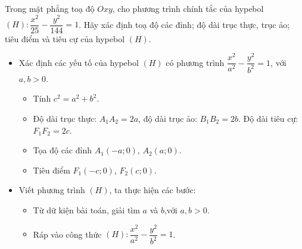 \begin{vd}%
	Trong mặt phẳng toạ độ $Oxy$, cho phương trình chính tắc của hypebol $(H)\colon \dfrac{x^2}{25}-\dfrac{y^2}{144}=1$. Hãy xác định toạ độ các đỉnh; độ dài trục thực, trục ảo; tiêu điểm và tiêu cự của hypebol $(H)$.
\end{vd}
\begin{dang}
		\begin{itemize}
		\item Xác định các yếu tố của hypebol $(H)$ có phương trình $\dfrac{x^2}{a^2}-\dfrac{y^2}{b^2}=1$, với $a,b>0$.
		\begin{itemize}
			\item Tính $c^2 = a^2 + b^2$.
			\item Độ dài trục thực: $A_1 A_2 = 2a$, độ dài trục ảo: $B_1 B_2 = 2b$. Độ dài tiêu cự: $F_1 F_2 = 2c$.
			\item Tọa độ các đỉnh $A_1(-a;0)$, $A_2(a;0)$.
			\item Tiêu điểm $F_1(-c;0)$,  $F_2(c;0)$.
		\end{itemize}
		\item Viết phương trình $(H)$, ta thực hiện các bước:
		\begin{itemize}
			\item Từ dữ kiện bài toán, giải tìm $a$ và $b$,với $a, b>0$. 
			\item Ráp vào công thức $(H): \dfrac{x^{2}}{a^{2}}-\dfrac{y^{2}}{b^{2}}=1$.
		\end{itemize}
	\end{itemize}
\end{dang}
